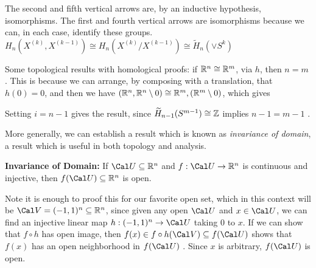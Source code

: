 
\ssk

The second and fifth vertical arrows are, by an inductive hypothesis, isomorphisms. The first and fourth vertical arrows are
isomorphisms because we can, in each case, identify these groups. 
$H_{n}(X^{(k)},X^{(k-1)})\cong H_{n}(X^{(k)}/X^{(k-1)})\cong \widetilde{H}_n(\vee S^k)$




\bigskip

Some topological results with homological proofs: if ${\Bbb R}^n\cong {\Bbb R}^m$, via $h$, then $n=m$ .
This is because we can arrange, by composing with a translation, that $h(0)=0$, and then 
we have 
$({\Bbb R}^n,{\Bbb R}^n\setminus 0)\cong {\Bbb R}^m,({\Bbb R}^m\setminus 0)$, which gives


\ssk



\ssk

Setting $i=n-1$ gives the result, since $\widetilde{H}_{n-1}(S^{m-1})\cong {\Bbb Z}$ implies $n-1=m-1$ .

\msk

More generally, we can establish a result which is known as {\it invariance of domain},
a result which is useful in both topology and analysis.

\msk

{\bf Invariance of Domain:} If ${\Cal U}\subseteq {\Bbb R}^n$ and $f:{\Cal U}\ra {\Bbb R}^n$
is continuous and injective, then $f({\Cal U})\subseteq {\Bbb R}^n$ is open.

\msk

Note it is enough to proof this for our favorite open set, which in this context will be ${\Cal V}=(-1,1)^n\subseteq {\Bbb R}^n$,
since given any open ${\Cal U}$ and $x\in{\Cal U}$, we can find an injective linear map $h:(-1,1)^n\ra {\Cal U}$
taking $0$ to $x$. If we can show that $f\circ h$ has open image, then $f(x)\in f\circ h({\Cal V})\subseteq f({\Cal U})$
shows that $f(x)$ has an open neighborhood in $f({\Cal U})$ . Since $x$ is arbitrary, $f({\Cal U})$ is open.


